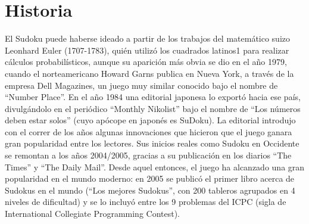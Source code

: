\documentclass[12pt,oneside]{book}
\begin{document}
\chapter{Historia}
El Sudoku puede haberse ideado a partir de los trabajos del matemático suizo Leonhard Euler (1707-1783), quién utilizó los cuadrados latinos1 para realizar cálculos probabilísticos,
aunque su aparición más obvia se dio en el año 1979, cuando el norteamericano Howard Garns publica en Nueva York, a través de la empresa Dell Magazines, un juego muy similar conocido
bajo el nombre de “Number Place”. En el año 1984 una editorial japonesa lo exportó hacia ese país, divulgándolo en el periódico “Monthly Nikolist” bajo el nombre de “Los números deben estar solos” 
(cuyo apócope en japonés es SuDoku). La editorial introdujo con el correr de los años algunas innovaciones que hicieron que el juego ganara gran popularidad entre los lectores. 
Sus inicios reales como Sudoku en Occidente se remontan a los años 2004/2005, gracias a su publicación en los diarios “The Times” y “The Daily Mail”. Desde aquel entonces,
el juego ha alcanzado una gran popularidad en el mundo moderno: en 2005 se publicó el primer libro acerca de Sudokus en el mundo (“Los mejores Sudokus”, con 200 tableros agrupados en 4 niveles de dificultad)
y se lo incluyó entre los 9 problemas del ICPC (sigla de International Collegiate Programming Contest). 
\end{document}
